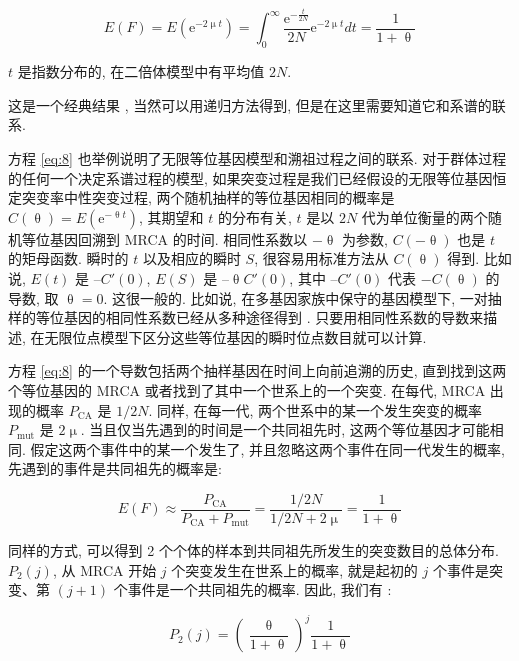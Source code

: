 \documentclass[12pt]{article}
\begin{document}
\begin{equation} \label{eq:8}
    E(F) = E(\mathrm{e}^{-2\upmu t}) = \int_{0}^{\infty} \frac{\mathrm{e}^{-\frac{t}{2N}}}{2N}\mathrm{e}^{-2\upmu t} dt = \frac{1}{1+\uptheta}
\end{equation}

$t$ 是指数分布的, 在二倍体模型中有平均值 $2N$.

这是一个经典结果 \parencite{kimura1964}, 当然可以用递归方法得到, 但是在这里需要知道它和系谱的联系.

方程 \ref{eq:8} 也举例说明了无限等位基因模型和溯祖过程之间的联系.
对于群体过程的任何一个决定系谱过程的模型, 如果突变过程是我们已经假设的无限等位基因恒定突变率中性突变过程,
两个随机抽样的等位基因相同的概率是 $C(\uptheta) = E(\mathrm{e}^{-\uptheta t})$,
其期望和 $t$ 的分布有关, $t$ 是以 $2N$ 代为单位衡量的两个随机等位基因回溯到 MRCA 的时间.
相同性系数以 $-\uptheta$ 为参数, $C(-\uptheta )$ 也是 $t$ 的矩母函数.
瞬时的 $t$ 以及相应的瞬时 $S$, 很容易用标准方法从 $C(\uptheta )$ 得到.
比如说, $E(t)$ 是 $–C'(0)$, $E(S)$ 是 $–\uptheta C'(0)$, 其中 $–C'(0)$ 代表 $-C(\uptheta )$ 的导数,
取 $\uptheta = 0$.
这很一般的. 比如说, 在多基因家族中保守的基因模型下, 一对抽样的等位基因的相同性系数已经从多种途径得到 \parencite{nagylaki1982}.
只要用相同性系数的导数来描述, 在无限位点模型下区分这些等位基因的瞬时位点数目就可以计算.

方程 \ref{eq:8} 的一个导数包括两个抽样基因在时间上向前追溯的历史,
直到找到这两个等位基因的 MRCA 或者找到了其中一个世系上的一个突变.
在每代, MRCA 出现的概率 $P_{\text{CA}}$ 是 $1/2N$.
同样, 在每一代, 两个世系中的某一个发生突变的概率 $P_{\text{mut}}$ 是 $2\upmu$.
当且仅当先遇到的时间是一个共同祖先时, 这两个等位基因才可能相同.
假定这两个事件中的某一个发生了, 并且忽略这两个事件在同一代发生的概率, 先遇到的事件是共同祖先的概率是:

\begin{equation} \label{eq:9}
    E(F) \approx \frac{P_{\text{CA}}}{P_{\text{CA}}+P_{\text{mut}}}=\frac{1/2N}{1/2N+2\upmu }=\frac{1}{1+\uptheta }
\end{equation}

同样的方式, 可以得到 2 个个体的样本到共同祖先所发生的突变数目的总体分布.
$P_{2}(j)$, 从 MRCA 开始 $j$ 个突变发生在世系上的概率, 就是起初的 $j$ 个事件是突变、第 $(j+1)$ 个事件是一个共同祖先的概率.
因此, 我们有 \parencite{watterson1975}:

\begin{equation} \label{eq:10}
    P_{2}(j)=\left (\frac{\uptheta}{1+\uptheta}\right )^{j}\frac{1}{1+\uptheta}
\end{equation}
\end{document}
